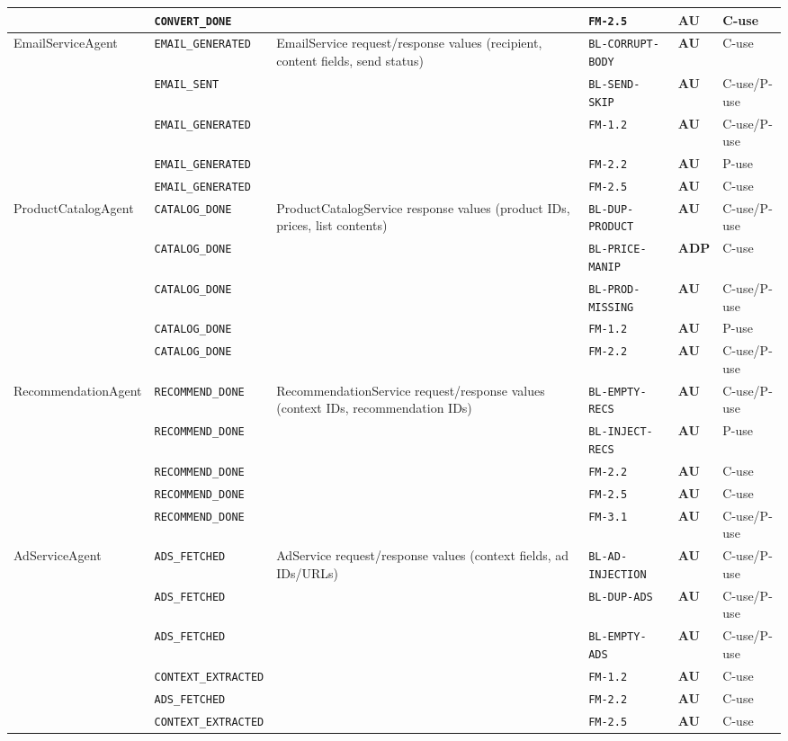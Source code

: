 \documentclass[sigconf,review,anonymous,balance=false]{acmart}
\begin{document}
\begin{table}[t]
\begin{tabular}{@{}p{2.45cm}p{2.55cm}p{4.35cm}p{2.75cm}ll@{}}
 & \texttt{CONVERT\_DONE} & & \texttt{FM-2.5} & \textbf{AU} & C-use \\
\midrule
EmailServiceAgent & \texttt{EMAIL\_GENERATED} & EmailService request/response values (recipient, content fields, send status) & \texttt{BL-CORRUPT-BODY} & \textbf{AU} & C-use \\
 & \texttt{EMAIL\_SENT} & & \texttt{BL-SEND-SKIP} & \textbf{AU} & C-use/P-use \\
 & \texttt{EMAIL\_GENERATED} & & \texttt{FM-1.2} & \textbf{AU} & C-use/P-use \\
 & \texttt{EMAIL\_GENERATED} & & \texttt{FM-2.2} & \textbf{AU} & P-use \\
 & \texttt{EMAIL\_GENERATED} & & \texttt{FM-2.5} & \textbf{AU} & C-use \\
\midrule
ProductCatalogAgent & \texttt{CATALOG\_DONE} & ProductCatalogService response values (product IDs, prices, list contents) & \texttt{BL-DUP-PRODUCT} & \textbf{AU} & C-use/P-use \\
 & \texttt{CATALOG\_DONE} & & \texttt{BL-PRICE-MANIP} & \textbf{ADP} & C-use \\
 & \texttt{CATALOG\_DONE} & & \texttt{BL-PROD-MISSING} & \textbf{AU} & C-use/P-use \\
 & \texttt{CATALOG\_DONE} & & \texttt{FM-1.2} & \textbf{AU} & P-use \\
 & \texttt{CATALOG\_DONE} & & \texttt{FM-2.2} & \textbf{AU} & C-use/P-use \\
\midrule
RecommendationAgent & \texttt{RECOMMEND\_DONE} & RecommendationService request/response values (context IDs, recommendation IDs) & \texttt{BL-EMPTY-RECS} & \textbf{AU} & C-use/P-use \\
 & \texttt{RECOMMEND\_DONE} & & \texttt{BL-INJECT-RECS} & \textbf{AU} & P-use \\
 & \texttt{RECOMMEND\_DONE} & & \texttt{FM-2.2} & \textbf{AU} & C-use \\
 & \texttt{RECOMMEND\_DONE} & & \texttt{FM-2.5} & \textbf{AU} & C-use \\
 & \texttt{RECOMMEND\_DONE} & & \texttt{FM-3.1} & \textbf{AU} & C-use/P-use \\
\midrule
AdServiceAgent & \texttt{ADS\_FETCHED} & AdService request/response values (context fields, ad IDs/URLs) & \texttt{BL-AD-INJECTION} & \textbf{AU} & C-use/P-use \\
 & \texttt{ADS\_FETCHED} & & \texttt{BL-DUP-ADS} & \textbf{AU} & C-use/P-use \\
 & \texttt{ADS\_FETCHED} & & \texttt{BL-EMPTY-ADS} & \textbf{AU} & C-use/P-use \\
 & \texttt{CONTEXT\_EXTRACTED} & & \texttt{FM-1.2} & \textbf{AU} & C-use \\
 & \texttt{ADS\_FETCHED} & & \texttt{FM-2.2} & \textbf{AU} & C-use \\
 & \texttt{CONTEXT\_EXTRACTED} & & \texttt{FM-2.5} & \textbf{AU} & C-use \\
\bottomrule
\end{tabular}
\end{table}
\end{document}
